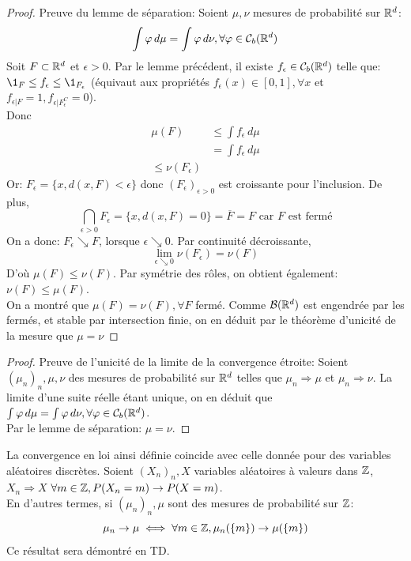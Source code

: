 \documentclass[]{report}
\begin{document}
    \begin{proof}
        Preuve du lemme de séparation: Soient $\mu,\nu$ mesures de probabilité sur $\mathbb{R}^d$:
        \[\int \varphi \,d\mu=\int \varphi\,d\nu,\forall \varphi\in \mathcal{C}_b(\mathbb{R}^d)\]
        Soit $F\subset \mathbb{R}^d$ et $\epsilon>0$. Par le lemme précédent, il existe $f_{\epsilon}\in \mathcal{C}_b(\mathbb{R}^d)$ telle que: $\1_F\le f_{\epsilon}\le \1_{F_\epsilon}$ (équivaut aux propriétés $f_{\epsilon}(x)\in [0,1],\forall x$ et $f_{\epsilon|F}=1,f_{\epsilon|F_\epsilon^C}=0$).\\
        Donc \begin{align*}
            \mu(F)&\le \int f_\epsilon \,d\mu\\
            &=\int f_\epsilon \,d\mu\\
            \le \nu(F_\epsilon)
        \end{align*}
        Or: $F_\epsilon=\{x,d(x,F)<\epsilon\}$ donc $(F_\epsilon)_{\epsilon>0}$ est croissante pour l'inclusion. De plus,
        \[\bigcap_{\epsilon>0}F_\epsilon =\{x,d(x,F)=0\}=\overline{F}=F\text{ car $F$ est fermé}\]
        On a donc: $F_\epsilon\searrow F$, lorsque $\epsilon \searrow 0$. Par continuité décroissante,
        \[\lim_{\epsilon \searrow 0} \nu\left(F_\epsilon\right)=\nu(F)\]
        D'où $\mu(F)\le \nu(F)$. Par symétrie des rôles, on obtient également: $\nu(F)\le \mu(F)$.\\
        On a montré que $\mu(F)=\nu(F),\forall F$ fermé. Comme $\mathcal{B}(\mathbb{R}^d)$ est engendrée par les fermés, et stable par intersection finie, on en déduit par le théorème d'unicité de la mesure que $\mu=\nu$
    \end{proof}

    \begin{proof}
        Preuve de l'unicité de la limite de la convergence étroite: Soient $(\mu_n)_n,\mu,\nu$ des mesures de probabilité sur $\mathbb{R}^d$ telles que $\mu_n\Longrightarrow \mu$ et $\mu_n \Longrightarrow \nu$. La limite d'une suite réelle étant unique, on en déduit que $\int \varphi\,d\mu=\int \varphi\,d\nu,\forall \varphi\in \mathcal{C}_b(\mathbb{R}^d)$.\\
        Par le lemme de séparation: $\mu=\nu$.
    \end{proof}

    \begin{re}{}{}
        La convergence en loi ainsi définie coincide avec celle donnée pour des variables aléatoires discrètes. Soient $(X_n)_n,X$ variables aléatoires à valeurs dans $\mathbb{Z}$,\\
        $X_n\Longrightarrow X$ \ssi $\forall m\in \mathbb{Z}, P(X_n=m)\to P(X=m)$.\\
        En d'autres termes, si $(\mu_n)_n,\mu$ sont des mesures de probabilité sur $\mathbb{Z}$:
        \[ \mu_n\to \mu\iff \forall m\in \mathbb{Z},\mu_n(\{m\})\to\mu(\{m\})\]
        Ce résultat sera démontré en TD.
    \end{re}
\end{document}
